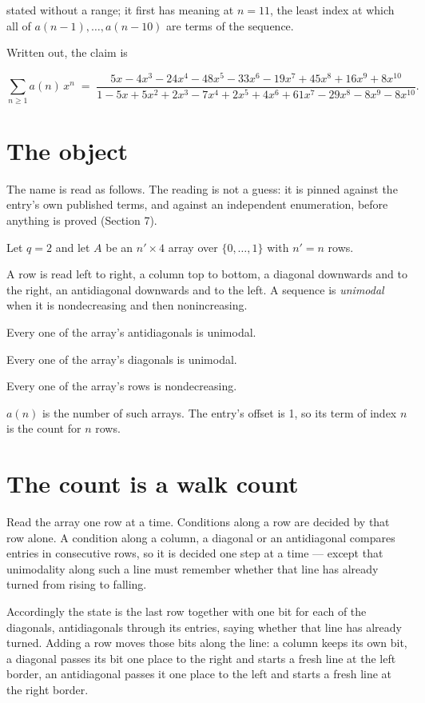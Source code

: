 \documentclass[11pt]{article}
\theoremstyle{definition}
\begin{document}
stated without a range; it first has meaning at $n = 11$, the least index at which all of $a(n-1),\dots,a(n-10)$ are terms of the sequence.

Written out, the claim is

\[\sum_{n \ge 1} a(n)\,x^n \;=\; \frac{5x - 4x^{3} - 24x^{4} - 48x^{5} - 33x^{6} - 19x^{7} + 45x^{8} + 16x^{9} + 8x^{10}}{1 - 5x + 5x^{2} + 2x^{3} - 7x^{4} + 2x^{5} + 4x^{6} + 61x^{7} - 29x^{8} - 8x^{9} - 8x^{10}}.\]

\section{The object}

The name is read as follows. The reading is not a guess: it is pinned against the entry's own published terms, and against an independent enumeration, before anything is proved (Section 7).

Let $q = 2$ and let $A$ be an $n' \times 4$ array over $\{0,\dots,1\}$ with $n' = n$ rows.

A row is read left to right, a column top to bottom, a diagonal downwards and to the right, an antidiagonal downwards and to the left. A sequence is {\itshape unimodal} when it is nondecreasing and then nonincreasing.

Every one of the array's antidiagonals is unimodal.

Every one of the array's diagonals is unimodal.

Every one of the array's rows is nondecreasing.

$a(n)$ is the number of such arrays. The entry's offset is 1, so its term of index $n$ is the count for $n$ rows.

\section{The count is a walk count}

Read the array one row at a time. Conditions along a row are decided by that row alone. A condition along a column, a diagonal or an antidiagonal compares entries in consecutive rows, so it is decided one step at a time --- except that unimodality along such a line must remember whether that line has already turned from rising to falling.

Accordingly the state is the last row together with one bit for each of the diagonals, antidiagonals through its entries, saying whether that line has already turned. Adding a row moves those bits along the line: a column keeps its own bit, a diagonal passes its bit one place to the right and starts a fresh line at the left border, an antidiagonal passes it one place to the left and starts a fresh line at the right border.
\end{document}
